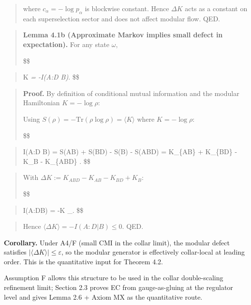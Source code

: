 \documentclass[11pt,a4paper]{article}
\theoremstyle{remark}
\begin{document}
\begin{quote}
where \(c_\alpha = -\log p_\alpha\) is blockwise constant. Hence \(\Delta K\) acts
as a constant on each superselection sector and does not affect modular flow.
QED.
\end{quote}

\begin{quote}
\textbf{Lemma 4.1b (Approximate Markov implies small defect in expectation).} For
any state \(\omega\),

\$\$
\end{quote}

\begin{quote}
\langle \Delta K \rangle\emph{\omega = -I(A:D \mid B)}\omega.
\$\$
\end{quote}

\begin{quote}
\textbf{Proof.} By definition of conditional mutual information and the modular
Hamiltonian \(K = -\log \rho\):

Using \(S(\rho) = -\mathrm{Tr}(\rho \log \rho) = \langle K \rangle\) where
\(K = -\log \rho\):

\$\$
\end{quote}

\begin{quote}
I(A:D \mid B) = S(AB) + S(BD) - S(B) - S(ABD)
= \langle K\_\{AB\} \rangle + \langle K\_\{BD\} \rangle - \langle K\_B \rangle - \langle K\_\{ABD\} \rangle.
\$\$
\end{quote}

\begin{quote}
With \(\Delta K := K_{ABD} - K_{AB} - K_{BD} + K_B\):

\$\$
\end{quote}

\begin{quote}
I(A:D\textbar B) = -\langle \Delta K \rangle\_\omega.
\$\$
\end{quote}

\begin{quote}
Hence \(\langle \Delta K \rangle = -I(A:D|B) \le 0\). QED.
\end{quote}

\textbf{Corollary.} Under A4/F (small CMI in the collar limit), the modular defect
satisfies \(|\langle \Delta K \rangle| \le \varepsilon\), so the modular generator
is effectively collar-local at leading order. This is the quantitative input
for Theorem 4.2.

Assumption F allows this structure to be used in the collar double-scaling
refinement limit; Section 2.3 proves EC from gauge-as-gluing at the regulator
level and gives Lemma 2.6 + Axiom MX as the quantitative route.
\end{document}
